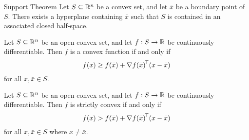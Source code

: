 \begin{thm}{Support Theorem}\label{support-theorem}\proofbreak
    Let $S \subseteq \mathbb{R}^n$ be a convex set, and let $\bar{x}$ be a boundary point of $S$. There exists a hyperplane containing $\bar{x}$ such that $S$ is contained in an associated closed half-space.
\end{thm}

\begin{thm}\label{convex-function-tangent-hyperplane}
    Let $S \subseteq \mathbb{R}^n$ be an open convex set, and let $f: S \to \mathbb{R}$ be continuously differentiable. Then $f$ is a convex function if and only if
    \begin{align*}
        f(x) \geq f(\bar{x}) + {\nabla f(\bar{x})}^{\mkern-1.5mu\mathsf{T}}(x - \bar{x})
    \end{align*}
    for all $x, \bar{x} \in S$. 
\end{thm}

\begin{thm}
    Let $S \subseteq \mathbb{R}^n$ be an open convex set, and let $f: S \to \mathbb{R}$ be continuously differentiable. Then $f$ is strictly convex if and only if 
    \begin{align*}
        f(x) > f(\bar{x}) + {\nabla f(\bar{x})}^{\mkern-1.5mu\mathsf{T}}(x - \bar{x})
    \end{align*}
    for all $x, \bar{x} \in S$ where $x \neq \bar{x}$. 
\end{thm}


